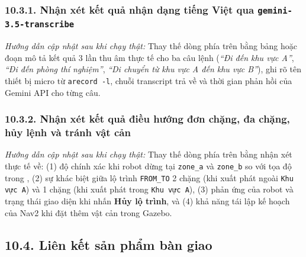 \subsubsection*{10.3.1. Nhận xét kết quả nhận dạng tiếng Việt qua \texttt{gemini-3.5-transcribe}}
\pending{}

\textit{Hướng dẫn cập nhật sau khi chạy thật:} Thay thế dòng \pending{} phía trên bằng bảng hoặc đoạn mô tả kết quả 3 lần thu âm thực tế cho ba câu lệnh (\textit{``Đi đến khu vực A''}, \textit{``Đi đến phòng thí nghiệm''}, \textit{``Di chuyển từ khu vực A đến khu vực B''}), ghi rõ tên thiết bị micro từ \texttt{arecord -l}, chuỗi transcript trả về và thời gian phản hồi của Gemini API cho từng câu.

\subsubsection*{10.3.2. Nhận xét kết quả điều hướng đơn chặng, đa chặng, hủy lệnh và tránh vật cản}
\pending{}

\textit{Hướng dẫn cập nhật sau khi chạy thật:} Thay thế dòng \pending{} phía trên bằng nhận xét thực tế về: (1) độ chính xác khi robot dừng tại \texttt{zone\_a} và \texttt{zone\_b} so với tọa độ trong , (2) sự khác biệt giữa lộ trình \texttt{FROM\_TO} 2 chặng (khi xuất phát ngoài \texttt{Khu vực A}) và 1 chặng (khi xuất phát trong \texttt{Khu vực A}), (3) phản ứng của robot và trạng thái giao diện khi nhấn \textbf{Hủy lộ trình}, và (4) khả năng tái lập kế hoạch của Nav2 khi đặt thêm vật cản trong Gazebo.

\subsection*{10.4. Liên kết sản phẩm bàn giao}

